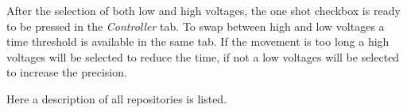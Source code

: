 After the selection of both low and high voltages, the one shot checkbox is ready to be pressed in the \emph{Controller} tab. To
swap between high and low voltages a time threshold is available in the same tab. If the movement is too long a high voltages will be selected to reduce the time, if not a low voltages will be selected to increase the precision.

Here a description of all repositories is listed.








